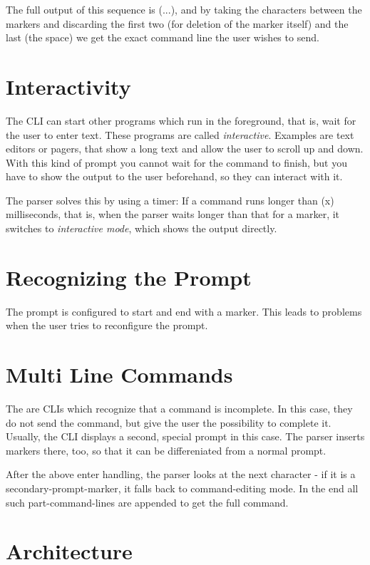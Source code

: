 \documentclass[twoside,parskip]{scrreprt}
\begin{document}
The full output of this sequence is (...), and by taking the characters between the markers and discarding the first two (for deletion of the marker itself) and the last (the space) we get the exact command line the user wishes to send.

\section{Interactivity}

The \textsc{CLI} can start other programs which run in the foreground, that is, wait for the user to enter text. These programs are called \emph{interactive}. Examples are text editors or pagers, that show a long text and allow the user to scroll up and down. With this kind of prompt you cannot wait for the command to finish, but you have to show the output to the user beforehand, so they can interact with it.

The parser solves this by using a timer: If a command runs longer than (x) milliseconds, that is, when the parser waits longer than that for a marker, it switches to \emph{interactive mode}, which shows the output directly.

\section{Recognizing the Prompt}

The prompt is configured to start and end with a marker. This leads to problems when the user tries to reconfigure the prompt.

\section{Multi Line Commands}

The are \textsc{CLI}s which recognize that a command is incomplete. In this case, they do not send the command, but give the user the possibility to complete it. Usually, the CLI displays a second, special prompt in this case. The parser inserts markers there, too, so that it can be differeniated from a normal prompt.

After the above enter handling, the parser looks at the next character - if it is a secondary-prompt-marker, it falls back to command-editing mode. In the end all such part-command-lines are appended to get the full command.

\section{Architecture}
\end{document}
